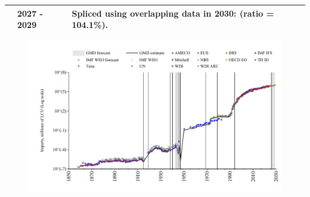\documentclass[12pt,a4paper,landscape]{article}
\begin{document}
\begin{adjustbox}{max totalsize={\paperwidth}{\paperheight},center}
\begin{minipage}[t][\textheight][t]{\textwidth}
\begin{table}[H]
\begin{tabular}{|l|l|l|}
\rowcolor{lightgray}\cite{IMF_WEO_forecast}& 2027 - 2029 &Spliced using overlapping data in 2030: (ratio = 104.1\%).\\
\hline
\end{tabular}
\end{table}
\begin{figure}[H]
\centering
\includegraphics[width=\textwidth,height=0.6\textheight,keepaspectratio]{graphs/ROU_imports.pdf}
\end{figure}
\end{minipage}
\end{adjustbox}
\end{document}
